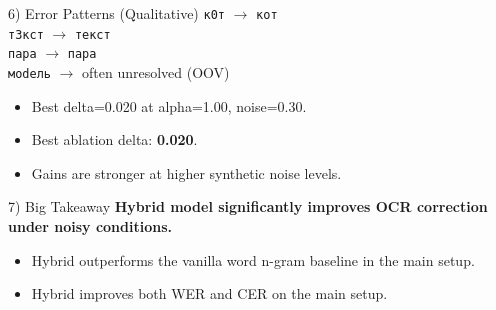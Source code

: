 \documentclass[9pt,a4paper,landscape]{article}
\begin{document}
\begin{minipage}[t]{0.49\textwidth}
\begin{posterbox}{6) Error Patterns (Qualitative)}
\textcolor{bad}{\texttt{к0т}} $\rightarrow$ \textcolor{good}{\texttt{кот}}\\
\textcolor{bad}{\texttt{т3кст}} $\rightarrow$ \textcolor{good}{\texttt{текст}}\\
\textcolor{bad}{\texttt{паpа}} $\rightarrow$ \textcolor{good}{\texttt{пара}}\\
\textcolor{bad}{\texttt{моdель}} $\rightarrow$ \textcolor{muted}{often unresolved (OOV)}
\vspace{1mm}
\begin{itemize}
\item Best delta=0.020 at alpha=1.00, noise=0.30.
\item Best ablation delta: \textcolor{good}{\textbf{0.020}}.
\item Gains are stronger at higher synthetic noise levels.
\end{itemize}
\end{posterbox}
\vspace{1mm}
\begin{posterbox}{7) Big Takeaway}
{\large \textbf{Hybrid model significantly improves OCR correction under noisy conditions.}}\\[1mm]
\begin{itemize}
\item Hybrid outperforms the vanilla word n-gram baseline in the main setup.
\item Hybrid improves both WER and CER on the main setup.
\end{itemize}
\end{posterbox}
\end{minipage}
\end{document}
